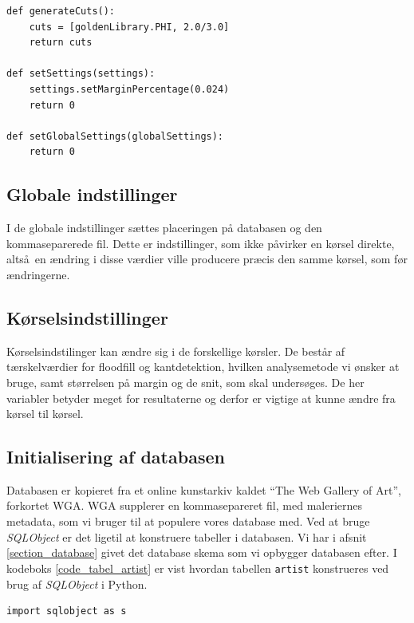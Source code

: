 {\begin{lstlisting}[caption={Pseudokode for et experiment, som checker på
    $\varPhi$ og $\frac{2}{3}$}, frame=tb, label={pseudo_experiment},
    captionpos=b, float=h]
def generateCuts():
	cuts = [goldenLibrary.PHI, 2.0/3.0]
	return cuts

def setSettings(settings):
	settings.setMarginPercentage(0.024)
	return 0

def setGlobalSettings(globalSettings):
	return 0
\end{lstlisting}

\subsection{Globale indstillinger}
I de globale indstillinger sættes placeringen på databasen og den
kommaseparerede fil. Dette er indstillinger, som ikke påvirker en kørsel
direkte, altså en ændring i disse værdier ville producere præcis
den samme kørsel, som før ændringerne. 

\subsection{Kørselsindstillinger}
Kørselsindstilinger kan ændre sig i de forskellige kørsler. De består af
tærskelværdier for floodfill og kantdetektion, hvilken analysemetode vi
ønsker at bruge, samt størrelsen på margin og de snit, som skal
undersøges. De her variabler betyder meget for resultaterne og derfor er
vigtige at kunne ændre fra kørsel til kørsel.

\subsection{Initialisering af databasen}
Databasen er kopieret fra et online kunstarkiv kaldet ``The Web Gallery
of Art''\cite{wgahu}, forkortet WGA. WGA supplerer en kommasepareret fil, med
maleriernes metadata, som vi bruger til at populere vores database med.
Ved at bruge \emph{SQLObject} er det ligetil at konstruere tabeller i
databasen. Vi har i afsnit \ref{section_database} givet det database
skema som vi opbygger databasen efter. I kodeboks
\ref{code_tabel_artist} er vist hvordan tabellen \texttt{artist}
konstrueres ved brug af \emph{SQLObject} i Python.

\begin{lstlisting}[caption={Pythonkode for oprettelse af tabeller i
    databasen.}, captionpos=b, label={code_tabel_artist}, frame=tb,
    breaklines=false, float=hb]
import sqlobject as s


\end{lstlisting}}
